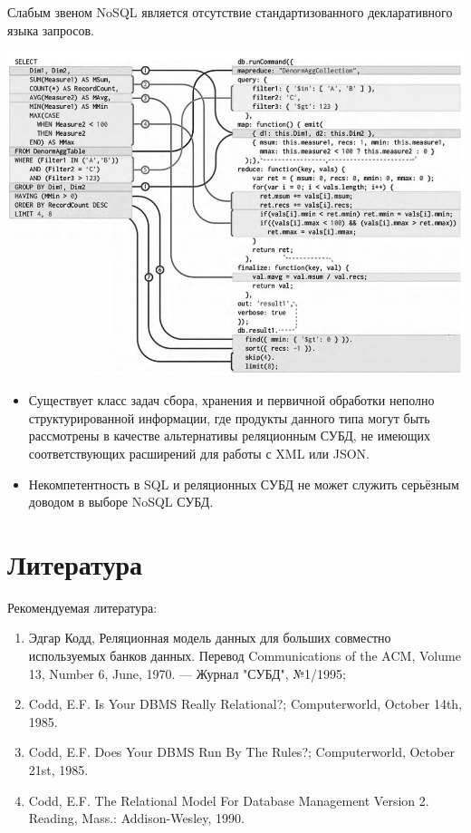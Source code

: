 \documentclass{beamer}
\begin{document}
\begin{frame} 
Слабым звеном NoSQL является отсутствие стандартизованного декларативного языка запросов.
\begin{center}
\includegraphics[scale=0.35]{images/nosql-01.png}
\end{center}
\end{frame}

\begin{frame} 
\begin{itemize}
\item Существует класс задач сбора, хранения и первичной обработки неполно структурированной информации, где продукты данного типа могут быть рассмотрены в качестве альтернативы реляционным СУБД, не имеющих
соответствующих расширений для работы с XML или JSON. 
\item Некомпетентность в SQL и реляционных СУБД не может служить серьёзным доводом в выборе NoSQL СУБД.
\end{itemize}
\end{frame}
 
\section*{Литература}
\begin{frame}   
Рекомендуемая литература:
\begin{enumerate}
\item Эдгар Кодд, Реляционная модель данных для больших совместно используемых банков данных. Перевод Communications of the ACM, Volume 13, Number 6, June, 1970. — Журнал "СУБД", №1/1995;
\item Codd, E.F. Is Your DBMS Really Relational?; Computerworld, October 14th, 1985.
\item Codd, E.F. Does Your DBMS Run By The Rules?; Computerworld, October 21st, 1985.
\item Codd, E.F. The Relational Model For Database Management Version 2. Reading, Mass.: Addison-Wesley, 1990.
\end{enumerate}
\end{frame}
\end{document}
